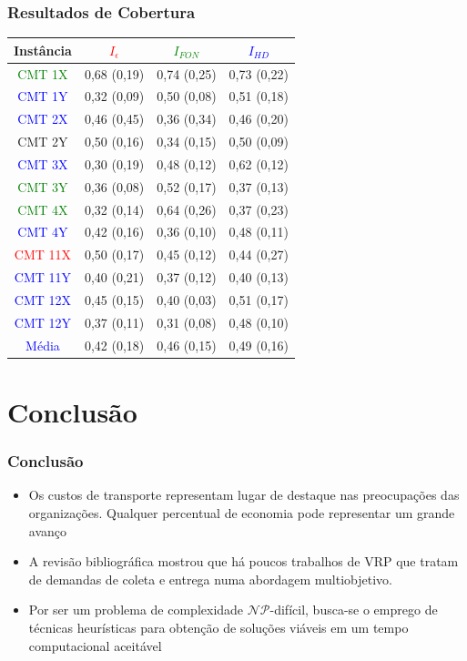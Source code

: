 \documentclass{beamer}
\begin{document}
\begin{frame}
  \frametitle{Resultados de Cobertura}
    \footnotesize{
    \begin{tabular}{c|ccc}
\hline
Instância & \textcolor{red}{$I_{\epsilon}$}             & \textcolor{green}{$I_{FON}$}             & \textcolor{blue}{ $I_{HD}$}      \\
\hline
\textcolor{green}{CMT 1X}  & 0,68 (0,19) & 0,74 (0,25) & 0,73 (0,22) \\
\textcolor{blue}{CMT 1Y}  & 0,32 (0,09) & 0,50 (0,08) & 0,51 (0,18) \\
\textcolor{blue}{CMT 2X}  & 0,46 (0,45) & 0,36 (0,34) & 0,46 (0,20) \\
CMT 2Y  & 0,50 (0,16) & 0,34 (0,15) & 0,50 (0,09) \\
\textcolor{blue}{CMT 3X}  & 0,30 (0,19) & 0,48 (0,12) & 0,62 (0,12) \\
\textcolor{green}{CMT 3Y}  & 0,36 (0,08) & 0,52 (0,17) & 0,37 (0,13) \\
\textcolor{green}{CMT 4X}  & 0,32 (0,14) & 0,64 (0,26) & 0,37 (0,23) \\
\textcolor{blue}{CMT 4Y}  & 0,42 (0,16) & 0,36 (0,10) & 0,48 (0,11) \\
\textcolor{red}{CMT 11X} & 0,50 (0,17) & 0,45 (0,12) & 0,44 (0,27) \\
\textcolor{blue}{CMT 11Y} & 0,40 (0,21) & 0,37 (0,12) & 0,40 (0,13) \\
\textcolor{blue}{CMT 12X} & 0,45 (0,15) & 0,40 (0,03) & 0,51 (0,17) \\
\textcolor{blue}{CMT 12Y}& 0,37 (0,11) & 0,31 (0,08) & 0,48 (0,10) \\
\hline
\textcolor{blue}{Média} & 0,42 (0,18) & 0,46 (0,15) & 0,49 (0,16)\\
\hline
\end{tabular}
  }
\end{frame}

\section{Conclusão}

\begin{frame}
  \frametitle{Conclusão}
    
    \begin{itemize}
    \item Os custos de transporte representam lugar de destaque nas preocupações das organizações. Qualquer percentual de economia pode representar um grande avanço
    \item A revisão bibliográfica mostrou que há poucos trabalhos de VRP que tratam de demandas de coleta e entrega numa abordagem multiobjetivo.
    \item Por ser um problema de complexidade $\mathcal{NP}$-difícil, busca-se o emprego de técnicas heurísticas para obtenção de soluções viáveis em um tempo 
    computacional aceitável
    \end{itemize}
  
\end{frame}
\end{document}
